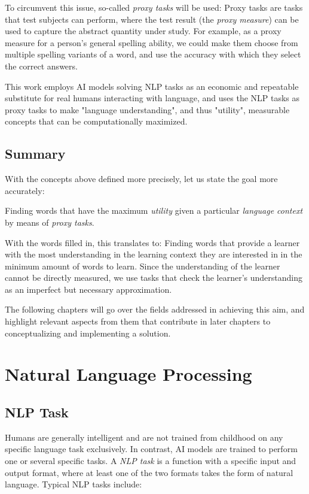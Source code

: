 To circumvent this issue, so-called \textit{proxy tasks} will be used:
Proxy tasks are tasks that test subjects can perform, where the test result (the \textit{proxy measure}) can be used to capture the abstract quantity under study.
For example, as a proxy measure for a person's general spelling ability, we could make them choose from multiple spelling variants of a word, and use the accuracy with which they select the correct answers.

This work employs AI models solving NLP tasks as an economic and repeatable substitute for real humans interacting with language, and uses the NLP tasks as proxy tasks to make "language understanding", and thus "utility", measurable concepts that can be computationally maximized.

\subsection{Summary}
With the concepts above defined more precisely, let us state the goal more accurately:

Finding words that have the maximum \textit{utility} given a particular \textit{language context} by means of \textit{proxy tasks}.

With the words filled in, this translates to:
Finding words that provide a learner with the most understanding in the learning context they are interested in in the minimum amount of words to learn.
Since the understanding of the learner cannot be directly measured, we use tasks that check the learner's understanding as an imperfect but necessary approximation.

The following chapters will go over the fields addressed in achieving this aim, and highlight relevant aspects from them that contribute in later chapters to conceptualizing and implementing a solution.


\section{Natural Language Processing} \label{sec:natural-language-processing}
\subsection{NLP Task}
Humans are generally intelligent and are not trained from childhood on any specific language task exclusively.
In contrast, AI models are trained to perform one or several specific tasks.
A \textit{NLP task} is a function with a specific input and output format, where at least one of the two formats takes the form of natural language.
Typical NLP tasks include:

